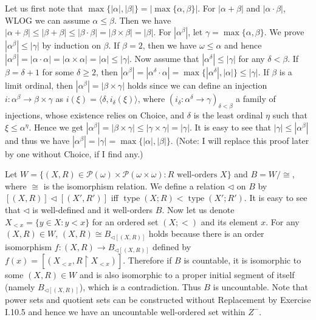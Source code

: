 \documentclass[12pt]{article}
\newcommand{\type}{\mathop{\mathrm{type}}}
\theoremstyle{definition}
\newenvironment{customthm}[1]
  {\renewcommand\theinnercustomthm{#1}\innercustomthm}
  {\endinnercustomthm}
\begin{document}
\begin{customthm}{I.11.34} Let us first note that $\max\{|\alpha|,|\beta|\}=|\max\{\alpha,\beta\}|$. For $|\alpha+\beta|$ and $|\alpha\cdot\beta|$, WLOG we can assume $\alpha\leq\beta$. Then we have $|\alpha+\beta|\leq|\beta+\beta|\leq|\beta\cdot\beta|=|\beta\times\beta|=|\beta|$. For $|\alpha^\beta|$, let $\gamma=\max\{\alpha,\beta\}$. We prove $|\alpha^\beta|\leq|\gamma|$ by induction on $\beta$. If $\beta=2$, then we have $\omega\leq\alpha$ and hence $|\alpha^\beta|=|\alpha\cdot\alpha|=|\alpha\times\alpha|=|\alpha|\leq|\gamma|$. Now assume that $|\alpha^\delta|\leq|\gamma|$ for any $\delta<\beta$. If $\beta=\delta+1$ for some $\delta\geq 2$, then $|\alpha^\beta|=|\alpha^\delta\cdot\alpha|=\max\{|\alpha^\delta|,|\alpha|\}\leq|\gamma|$. If $\beta$ is a limit ordinal, then $|\alpha^\beta|=|\beta\times\gamma|$ holds since we can define an injection $i:\alpha^\beta\rightarrow\beta\times\gamma$ as $i(\xi)=\langle\delta,i_\delta(\xi)\rangle$, where $(i_\delta:\alpha^\delta\rightarrow\gamma)_{\delta<\beta}$ a family of injections, whose existence relies on Choice, and $\delta$ is the least ordinal $\eta$ such that $\xi\leq\alpha^\eta$. Hence we get $|\alpha^\beta|=|\beta\times\gamma|\leq|\gamma\times\gamma|=|\gamma|$. It is easy to see that $|\gamma|\leq|\alpha^\beta|$ and thus we have $|\alpha^\beta|=|\gamma|=\max\{|\alpha|,|\beta|\}$. (Note: I will replace this proof later by one without Choice, if I find any.)
\end{customthm}

\begin{customthm}{I.11.35} Let $W=\{(X,R)\in\mathcal{P}(\omega)\times\mathcal{P(\omega\times\omega)}:R\text{ well-orders }X\}$ and $B=W/\cong$, where $\cong$ is the isomorphism relation. We define a relation $\triangleleft$ on $B$ by $[(X,R)]\triangleleft[(X',R')]$ iff $\type(X;R)<\type(X';R')$. It is easy to see that $\triangleleft$ is well-defined and it well-orders $B$. Now let us denote $X_{<x}=\{y\in X:y<x\}$ for an ordered set $(X;<)$ and its element $x$. For any $(X,R)\in W$, $(X,R)\cong B_{\triangleleft[(X,R)]}$ holds because there is an order isomorphism $f:(X,R)\rightarrow B_{\triangleleft[(X,R)]}$ defined by $f(x)=[(X_{<x},R\upharpoonright X_{<x})]$. Therefore if $B$ is countable, it is isomorphic to some $(X,R)\in W$ and is also isomorphic to a proper initial segment of itself (namely $B_{\triangleleft[(X,R)]}$), which is a contradiction. Thus $B$ is uncountable. Note that power sets and quotient sets can be constructed without Replacement by Exercise I.10.5 and hence we have an uncountable well-ordered set within $Z^-$.
\end{customthm}
\end{document}
